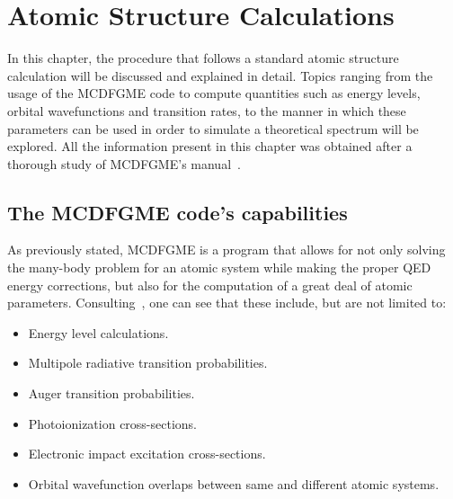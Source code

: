
%


\chapter{Atomic Structure Calculations}\label{cha:atom_calc}

In this chapter, the procedure that follows a standard atomic structure calculation will be discussed and explained in detail. Topics ranging from the usage of the \gls{MCDFGME} code to compute  quantities such as energy levels, orbital wavefunctions and transition rates, to the manner in which these parameters can be used in order to simulate a theoretical spectrum will be explored. All the information present in this chapter was obtained after a thorough study of \gls{MCDFGME}'s manual~\cite{Desclaux_Indelicato_2019}.


\section{The \gls{MCDFGME} code's capabilities}
As previously stated, \gls{MCDFGME} is a program that allows for not only solving the many-body problem for an atomic system while making the proper \gls{QED} energy corrections, but also for the computation of a great deal of atomic parameters. Consulting~\cite{mcdfWebsite}, one can see that these include, but are not limited to:

\begin{itemize}
    \item Energy level calculations.
    \item Multipole radiative transition probabilities.
    \item Auger transition probabilities.
    \item Photoionization cross-sections.
    \item Electronic impact excitation cross-sections.
    \item Orbital wavefunction overlaps between same and different atomic systems.
\end{itemize}

